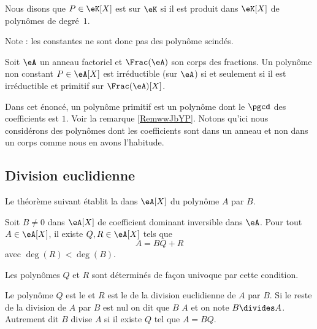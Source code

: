 \begin{definition}  \label{DefCPLSooQaHJKQ}
    Nous disons que \( P\in\eK[X]\) est  sur \(\eK\) si il est produit dans \(\eK[X]\) de polynômes de degré~\( 1\). 
\end{definition}
Note : les constantes ne sont donc pas des polynôme scindés.

\begin{theorem}     \label{ThofiIpXg} 
    Soit \( \eA\) un anneau factoriel et \( \Frac(\eA)\) son corps des fractions. Un polynôme non constant \( P\in \eA[X]\) est irréductible (sur \( \eA\)) si et seulement si il est irréductible et primitif sur \( \Frac(\eA)[X]\). 
\end{theorem}

Dans cet énoncé, un polynôme primitif est un polynôme dont le \( \pgcd\) des coefficients est \( 1\). Voir la remarque \ref{RemwwJbYP}. Notons qu'ici nous considérons des polynômes dont les coefficients sont dans un anneau et non dans un corps comme nous en avons l'habitude.

\subsection{Division euclidienne}

Le théorème suivant établit la  dans \( \eA[X]\) du polynôme \( A\) par \( B\).
\begin{theorem}     \label{ThodivEuclPsFexf}
    Soit \( B\neq 0\) dans \( \eA[X]\) de coefficient dominant inversible dans \( \eA\). Pour tout \( A\in\eA[X]\), il existe \( Q,R\in \eA[X]\) tels que
    \begin{equation}
        A=BQ+R
    \end{equation}
    avec \( \deg(R)<\deg(B)\).

    Les polynômes \( Q\) et \( R\) sont déterminés de façon univoque par cette condition. 
    
\end{theorem}

\begin{definition}\label{DefMPZooMmMymG}
    Le polynôme \( Q\) est le  et \( R\) est le  de la division euclidienne de \( A\) par \( B\). Si le reste de la division de \( A\) par $B$ est nul on dit que \( B\)  \( A\) et on note \( B\divides A\). Autrement dit \( B\) divise \( A\) si il existe \( Q\) tel que \( A=BQ\).
\end{definition}

